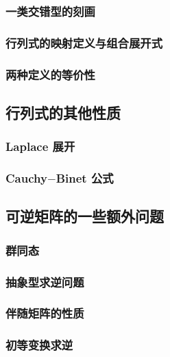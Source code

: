 \documentclass[10pt,openany]{article}
\theoremstyle{thmstyle} %
\theoremstyle{defstyle} %
\theoremstyle{prostyle} %
\theoremstyle{exastyle}
\theoremstyle{remstyle}
\begin{document}
\subsubsection{一类交错型的刻画}


\subsubsection{行列式的映射定义与组合展开式}


\subsubsection{两种定义的等价性}


\subsection{行列式的其他性质}

\subsubsection{Laplace 展开}

\subsubsection{Cauchy\(-\)Binet 公式}

\subsection{可逆矩阵的一些额外问题}

\subsubsection{群同态}

\subsubsection{抽象型求逆问题}

\subsubsection{伴随矩阵的性质}

\subsubsection{初等变换求逆}
\end{document}
